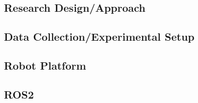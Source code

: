 \subsection{Research Design/Approach }


\subsection{Data Collection/Experimental Setup}

\subsection{Robot Platform}


\subsection{ROS2}



